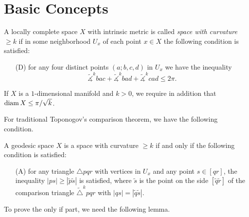 \section{Basic Concepts}
\begin{defn}
    A locally complete space $X$ with intrinsic metric is called \emph{space with curvature $\geq k$} if in some neighborhood $U_x$ of each point $x\in X$ the following condition is satisfied:
    \begin{itemize}
        \item[(D)] for any four distinct points $(a;b,c,d)$ in $U_x$ we have the inequality
        \[\tilde{\measuredangle}^kbac+\tilde{\measuredangle}^kbad+\tilde{\measuredangle}^kcad\leq 2\pi.\]
    \end{itemize}
    If $X$ is a $1$-dimensional manifold and $k>0$, we require in addition that $\operatorname{diam}{X}\leq\pi/\sqrt{k}$.
\end{defn}

For traditional Toponogov's comparison theorem, we have the following condition.
\begin{thm}\label{thm:CBB A condition}
    A geodesic space $X$ is a space with curvature $\geq k$ if and only if the following condition is satisfied:
    \begin{itemize}
        \item[\rm (A)] for any triangle $\triangle{pqr}$ with vertices in $U_x$ and any point $s\in[qr]$, the inequality $|ps|\geq|\tilde{p}\tilde{s}|$ is satisfied, where $\tilde{s}$ is the point on the side $[\tilde{q}\tilde{r}]$ of the comparison triangle $\tilde{\triangle}^kpqr$ with $|qs|=|\tilde{q}\tilde{s}|$.
    \end{itemize}
\end{thm}

To prove the only if part, we need the following lemma.

